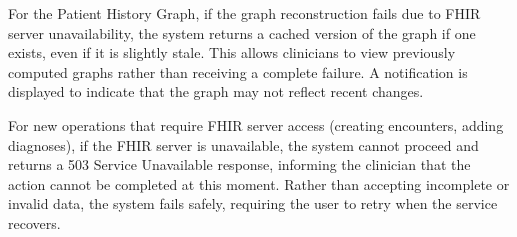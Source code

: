 For the Patient History Graph, if the graph reconstruction fails due to FHIR
server unavailability, the system returns a cached version of the graph if one
exists, even if it is slightly stale. This allows clinicians to view previously
computed graphs rather than receiving a complete failure. A notification is
displayed to indicate that the graph may not reflect recent changes.

For new operations that require FHIR server access (creating encounters, adding
diagnoses), if the FHIR server is unavailable, the system cannot proceed and
returns a 503 Service Unavailable response, informing the clinician that the
action cannot be completed at this moment. Rather than accepting incomplete or
invalid data, the system fails safely, requiring the user to retry when the
service recovers.




